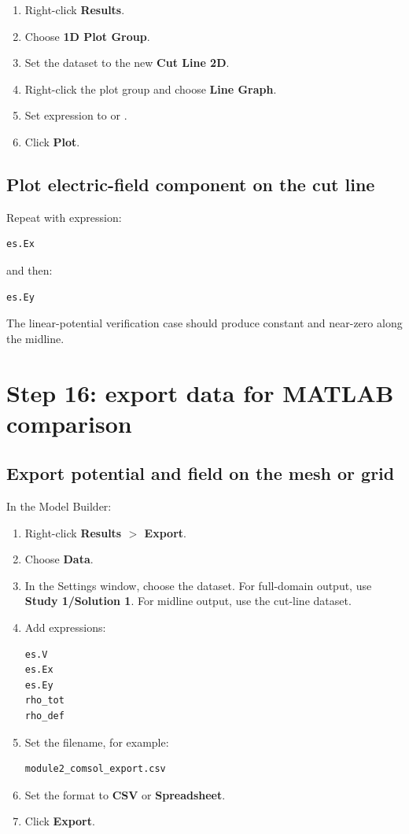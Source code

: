 \documentclass[11pt]{article}
\newcommand{\code}[1]{\texttt{\detokenize{#1}}}
\begin{document}
\begin{enumerate}[leftmargin=2em]
\item Right-click \textbf{Results}.
\item Choose \textbf{1D Plot Group}.
\item Set the dataset to the new \textbf{Cut Line 2D}.
\item Right-click the plot group and choose \textbf{Line Graph}.
\item Set expression to \code{es.V} or \code{V}.
\item Click \textbf{Plot}.
\end{enumerate}

\subsection{Plot electric-field component on the cut line}

Repeat with expression:
\begin{verbatim}
es.Ex
\end{verbatim}
and then:
\begin{verbatim}
es.Ey
\end{verbatim}

The linear-potential verification case should produce constant \code{es.Ex} and near-zero \code{es.Ey} along the midline.

\section{Step 16: export data for MATLAB comparison}

\subsection{Export potential and field on the mesh or grid}

In the Model Builder:
\begin{enumerate}[leftmargin=2em]
\item Right-click \textbf{Results $>$ Export}.
\item Choose \textbf{Data}.
\item In the Settings window, choose the dataset. For full-domain output, use \textbf{Study 1/Solution 1}. For midline output, use the cut-line dataset.
\item Add expressions:
\begin{verbatim}
es.V
es.Ex
es.Ey
rho_tot
rho_def
\end{verbatim}
\item Set the filename, for example:
\begin{verbatim}
module2_comsol_export.csv
\end{verbatim}
\item Set the format to \textbf{CSV} or \textbf{Spreadsheet}.
\item Click \textbf{Export}.
\end{enumerate}
\end{document}
